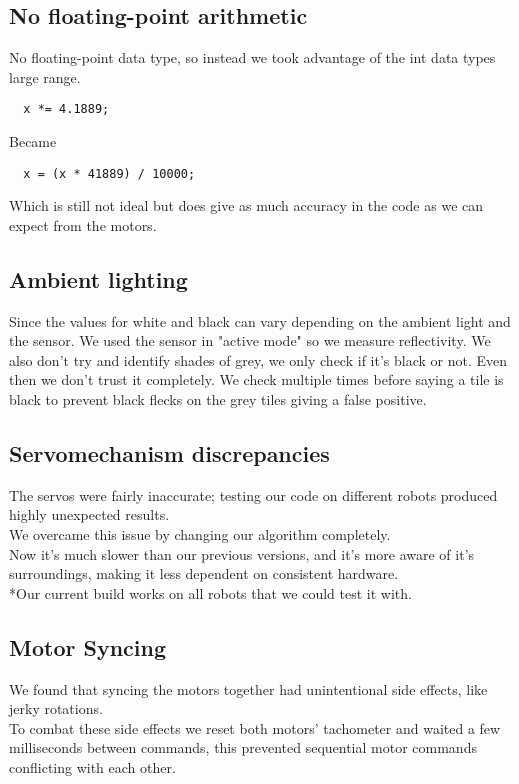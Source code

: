 \documentclass[a4paper,11pt]{article}
\begin{document}
\subsection{No floating-point arithmetic}
No floating-point data type, so instead we took advantage of the int data types large range.
\begin{lstlisting}
  x *= 4.1889;
\end{lstlisting}
Became
\begin{lstlisting}
  x = (x * 41889) / 10000;
\end{lstlisting}
Which is still not ideal but does give as much accuracy in the code as we can expect from the motors.

\subsection{Ambient lighting}
Since the values for white and black can vary depending on the ambient light and the sensor.
We used the sensor in "active mode" so we measure reflectivity. We also don't try and identify shades of grey, we only check if it's black or not. Even then we don't trust it completely. We check multiple times before saying a tile is black to prevent black flecks on the grey tiles giving a false positive.

\subsection{Servomechanism discrepancies}
The servos were fairly inaccurate; testing our code on different robots produced highly unexpected results.
\\We overcame this issue by changing our algorithm completely.
\\Now it's much slower than our previous versions, and it's more aware of it's surroundings, making it less dependent on consistent hardware.
\\*Our current build works on all robots that we could test it with.

\subsection{Motor Syncing}
We found that syncing the motors together had unintentional side effects, like jerky rotations.
\\To combat these side effects we reset both motors’ tachometer and waited a few milliseconds between commands, this prevented sequential motor commands conflicting with each other.
\end{document}
